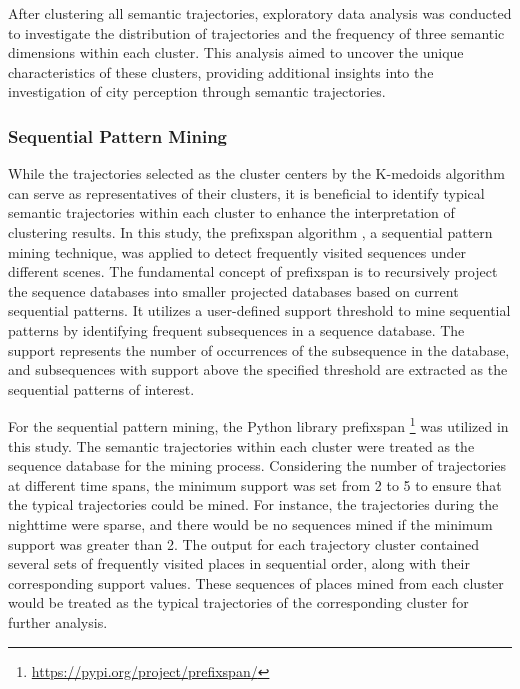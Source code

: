 \documentclass{article}
\theoremstyle{remark}
\begin{document}
After clustering all semantic trajectories, exploratory data analysis was conducted to investigate the distribution of trajectories and the frequency of three semantic dimensions within each cluster. This analysis aimed to uncover the unique characteristics of these clusters, providing additional insights into the investigation of city perception through semantic trajectories.

\subsubsection{Sequential Pattern Mining}
While the trajectories selected as the cluster centers by the K-medoids algorithm can serve as representatives of their clusters, it is beneficial to identify typical semantic trajectories within each cluster to enhance the interpretation of clustering results. In this study, the \acrfull{prefixspan} algorithm \citep{pei_mining_2004}, a sequential pattern mining technique, was applied to detect frequently visited sequences under different scenes. The fundamental concept of \acrshort{prefixspan} is to recursively project the sequence databases into smaller projected databases based on current sequential patterns. It utilizes a user-defined support threshold to mine sequential patterns by identifying frequent subsequences in a sequence database. The support represents the number of occurrences of the subsequence in the database, and subsequences with support above the specified threshold are extracted as the sequential patterns of interest.

For the sequential pattern mining, the Python library prefixspan \footnote{\url{https://pypi.org/project/prefixspan/}} was utilized in this study. The semantic trajectories within each cluster were treated as the sequence database for the mining process. Considering the number of trajectories at different time spans, the minimum support was set from 2 to 5 to ensure that the typical trajectories could be mined. For instance, the trajectories during the nighttime were sparse, and there would be no sequences mined if the minimum support was greater than 2. The output for each trajectory cluster contained several sets of frequently visited places in sequential order, along with their corresponding support values. These sequences of places mined from each cluster would be treated as the typical trajectories of the corresponding cluster for further analysis.
\end{document}
